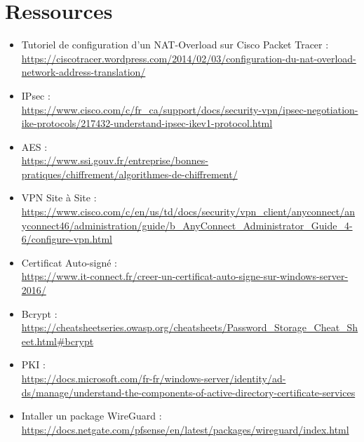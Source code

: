 \section*{Ressources}
\begin{itemize}
  \item Tutoriel de configuration d’un NAT-Overload sur Cisco Packet Tracer : \\
  \url{https://ciscotracer.wordpress.com/2014/02/03/configuration-du-nat-overload-network-address-translation/}
  \item IPsec : \\
  \url{https://www.cisco.com/c/fr_ca/support/docs/security-vpn/ipsec-negotiation-ike-protocols/217432-understand-ipsec-ikev1-protocol.html }
  \item AES : \\
  \url{https://www.ssi.gouv.fr/entreprise/bonnes-pratiques/chiffrement/algorithmes-de-chiffrement/}
  \item VPN Site à Site : \\
  \url{https://www.cisco.com/c/en/us/td/docs/security/vpn_client/anyconnect/anyconnect46/administration/guide/b_AnyConnect_Administrator_Guide_4-6/configure-vpn.html}
  \item Certificat Auto-signé : \\
  \url{https://www.it-connect.fr/creer-un-certificat-auto-signe-sur-windows-server-2016/}
  \item Bcrypt : \\
  \url{https://cheatsheetseries.owasp.org/cheatsheets/Password_Storage_Cheat_Sheet.html#bcrypt}
  \item PKI : \\
  \url{https://docs.microsoft.com/fr-fr/windows-server/identity/ad-ds/manage/understand-the-components-of-active-directory-certificate-services}
  \item Intaller un package WireGuard : \\
  \url{https://docs.netgate.com/pfsense/en/latest/packages/wireguard/index.html}
\end{itemize}
